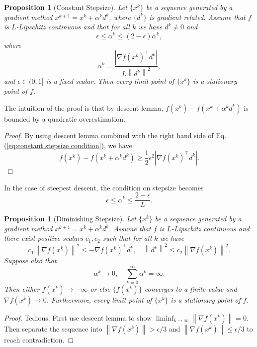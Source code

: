 \documentclass[12pt,a4paper]{report}
\numberwithin{equation}{section}
\theoremstyle{mystyle}
\newtheorem{proposition}[definition]{Proposition}
\newcommand{\grad}{\nabla}
\newcommand{\T}{\top}
\newcommand{\abs}[1]{\left\lvert #1 \right\rvert}
\newcommand{\norm}[1]{\left\lVert #1 \right\rVert}
\begin{document}
	\begin{proposition}[Constant Stepsize]
		Let $\{x^k\}$ be a sequence generated by a gradient method $x^{k+1}=x^k +\alpha^k d^k$, where $\{d^k\}$ is gradient related. Assume that $f$ is $L$-Lipschitz continuous and that for all $k$ we have $d^k\neq 0$ and 
		\begin{equation}
			\epsilon \leq \alpha^k\leq (2-\epsilon)\bar{\alpha}^k, \label{eq:constant stepsize condition}
		\end{equation}
		where
		$$
		\bar{\alpha}^k =\frac{\abs{\grad f(x^k)^\T d^k}}{L\norm{d^k}^2},
		$$
		and $\epsilon\in(0,1]$ is a fixed scalar. Then every limit point of $\{x^k\}$ is a stationary point of $f$.
	\end{proposition}
	The intuition of the proof is that by descent lemma, $f(x^k)-f(x^k +\alpha^k d^k)$ is bounded by a quadratic overestimation.
	\begin{proof}
		By using descent lemma combined with the right hand side of Eq. (\ref{eq:constant stepsize condition}), we have
		$$
		f(x^k)-f(x^k +\alpha^k d^k) \geq \frac{1}{2}\epsilon^2 \abs{\grad f(x^k)^\T d^k}.
		$$
	\end{proof}
	In the case of steepest descent, the condition on stepsize becomes
	$$
	\epsilon\leq \alpha^k \leq \frac{2-\epsilon}{L}.
	$$
	\begin{proposition}[Diminishing Stepsize]
		Let $\{x^k\}$ be a sequence generated by a gradient method $x^{k+1}=x^k +\alpha^k d^k$. Assume that $f$ is $L$-Lipschitz continuous and there exist positive scalars $c_1,c_2$ such that for all $k$ we have
		\begin{equation}
			c_1 \norm{\grad f(x^k)}^2 \leq -\grad f(x^k)^\T d^k,\quad \norm{d^k}^2 \leq c_2 \norm{\grad f(x^k)}^2.
		\end{equation}
		Suppose also that
		$$
		\alpha^k\to 0, \quad \sum_{k=0}^\infty \alpha^k =\infty.
		$$
		Then either $f(x^k)\to -\infty$ or else $\{f(x^k)\}$ converges to a finite value and $\grad f(x^k)\to 0$. Furthermore, every limit point of $\{x^k\}$ is a stationary point of $f$.
	\end{proposition}
	\begin{proof}
		Tedious. First use descent lemma to show $\liminf_{k\to\infty}\norm{\grad f(x^k)}=0$. Then separate the sequence into $\norm{\grad f(x^k)}>\epsilon/3$ and $\norm{\grad f(x^k)}\leq \epsilon/3$ to reach contradiction.
	\end{proof}
	
\end{document}
